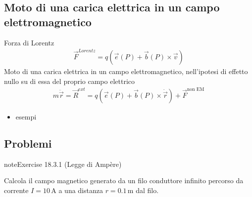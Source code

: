 \documentclass[letterpaper,10pt,italian]{jupyterBook}
\begin{document}
\subsection{Moto di una carica elettrica in un campo elettromagnetico}
\label{\detokenize{ch/electromagnetism/electromagnetism-steady:moto-di-una-carica-elettrica-in-un-campo-elettromagnetico}}
\sphinxAtStartPar
Forza di Lorentz
\begin{equation*}
\begin{split}\vec{F}^{Lorentz} = q \left(\vec{e}(P) + \vec{b}(P) \times \vec{v} \right)\end{split}
\end{equation*}
\sphinxAtStartPar
Moto di una carica elettrica in un campo elettromagnetico, nell’ipotesi di effetto nullo su di essa del proprio campo elettrico
\begin{equation*}
\begin{split}m \ddot{ \vec{r} } = \vec{R}^{ext} = q \left( \vec{e}(P) + \vec{b}(P) \times \dot{\vec{r}} \right) + \vec{F}^{\text{non EM}}\end{split}
\end{equation*}\begin{itemize}
\item {} 
\sphinxAtStartPar
{} esempi

\end{itemize}

\sphinxstepscope


\subsection{Problemi}
\label{\detokenize{ch/electromagnetism/electromagnetism-steady-problems:problemi}}\label{\detokenize{ch/electromagnetism/electromagnetism-steady-problems:physics-hs-electromagnetism-electromagnetism-steady-problems}}\label{\detokenize{ch/electromagnetism/electromagnetism-steady-problems::doc}} \label{exercise:ch/electromagnetism/electromagnetism-steady-problems-exercise-0}

\begin{sphinxadmonition}{note}{Exercise 18.3.1 (Legge di Ampère)}



\sphinxAtStartPar
Calcola il campo magnetico generato da un filo conduttore infinito percorso da corrente \(I = 10 \, \text{A}\) a una distanza \(r = 0.1 \, \text{m}\) dal filo.
\end{sphinxadmonition}
 \label{exercise:ch/electromagnetism/electromagnetism-steady-problems-exercise-1}
\end{document}
